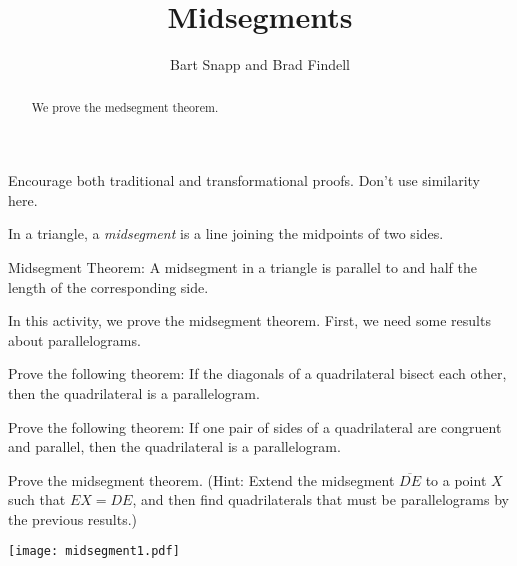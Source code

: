 \documentclass[nooutcomes]{ximera}
\title{Midsegments}
\author{Bart Snapp and Brad Findell}
\begin{document}
\begin{abstract}
  We prove the medsegment theorem.
\end{abstract}
\maketitle

\begin{teachingnote}
Encourage both traditional and transformational proofs.  Don't use similarity here.
\end{teachingnote}

\begin{definition}
In a triangle, a \emph{midsegment} is a line joining the midpoints of two sides.  
\end{definition}

\begin{theorem}
Midsegment Theorem:  A midsegment in a triangle is parallel to and half the length of the corresponding side.
\end{theorem}

In this activity, we prove the midsegment theorem.  First, we need some results about parallelograms. 

\begin{problem}
Prove the following theorem:  If the diagonals of a quadrilateral bisect each other, then the quadrilateral is a parallelogram. 
\end{problem}

\begin{problem}
Prove the following theorem:  If one pair of sides of a quadrilateral are congruent and parallel, then the quadrilateral is a parallelogram. 
\end{problem}

\begin{problem}
Prove the midsegment theorem.  (Hint:  Extend the midsegment $\overline{DE}$ to a point $X$ such that $EX=DE$, and then find quadrilaterals that must be parallelograms by the previous results.)  
\begin{image}
\texttt{[image: midsegment1.pdf]}
\end{image}
\end{problem}
\end{document}
